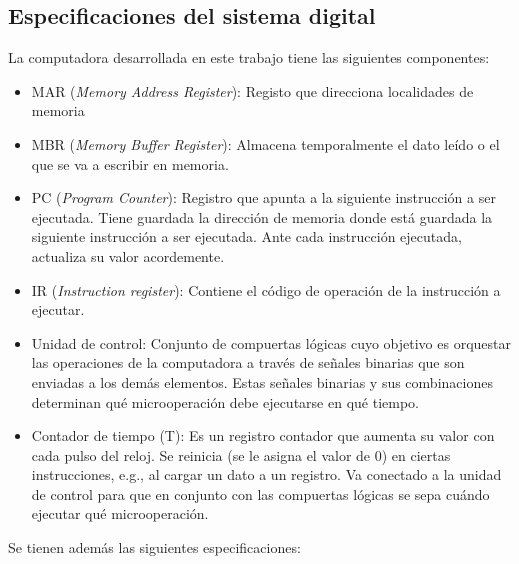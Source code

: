 \documentclass{article}
\begin{document}
\subsection{Especificaciones del sistema digital}

La computadora desarrollada en este trabajo tiene las siguientes componentes:

\begin{itemize}
    \item MAR (\textit{Memory Address Register}): Registo que direcciona localidades de memoria
    
    \item MBR (\textit{Memory Buffer Register}): Almacena temporalmente el dato leído o el que se va a escribir en memoria.
    
    \item PC (\textit{Program Counter}): Registro que apunta a la siguiente instrucción a ser ejecutada. Tiene guardada la dirección de memoria donde está guardada la siguiente instrucción a ser ejecutada. Ante cada instrucción ejecutada, actualiza su valor acordemente.
    
    \item IR (\textit{Instruction register}): Contiene el código de operación de la instrucción a ejecutar.
    
    \item Unidad de control: Conjunto de compuertas lógicas cuyo objetivo es orquestar las operaciones de la computadora a través de señales binarias que son enviadas a los demás elementos. Estas señales binarias y sus combinaciones determinan qué microoperación debe ejecutarse en qué tiempo.
    
    \item Contador de tiempo (T): Es un registro contador que aumenta su valor con cada pulso del reloj. Se reinicia (se le asigna el valor de $0$) en ciertas instrucciones, e.g., al cargar un dato a un registro. Va conectado a la unidad de control para que en conjunto con las compuertas lógicas se sepa cuándo ejecutar qué microoperación.
    
\end{itemize}
    
Se tienen además las siguientes especificaciones:
\end{document}
